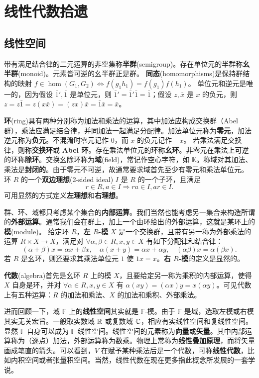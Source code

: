 \chapter{线性代数拾遗}\label{appx:LA}

\section{线性空间}

带有满足结合律的二元运算的非空集称\textbf{半群}(semigroup)。存在单位元的半群称\textbf{幺半群}(monoid)。元素皆可逆的幺半群正是群。
\textbf{同态}(homomorphisms)是保持群结构的映射 $f \in \hom(G_1, G_2 ) \Leftrightarrow f (g_1 h_1 )=f (g_1 ) f (h_1 )$。
单位元和逆元是唯一的，因为假设 $\bar 1',\bar 1$ 是单位元，则 $\bar 1'=\bar 1'\bar 1=\bar 1$；假设 $z,\bar x$ 是 $x$ 的负元，则 $z=z\bar 1=z(x\bar x)=(zx)\bar x=\bar 1\bar x=\bar x$。

\textbf{环}(ring)具有两种分别称为加法和乘法的运算，其中加法应构成交换群（Abel 群），乘法应满足结合律，并同加法一起满足分配律。加法单位元称为\textbf{零元}，加法逆元称为\textbf{负元}。不混淆时零元记作 $0$，而 $x$ 的负元记作 $-x$。
若乘法满足交换律，则称\textbf{交换环}或 \textbf{Abel 环}。存在乘法单位元的环称\textbf{幺环}。非零元在乘法上可逆的环称\textbf{除环}。交换幺除环称为\textbf{域}(field)，常记作空心字符，如 $\mathbb{K}$。称域对其加法、乘法是\textbf{封闭的}。由于零元不可逆，故通常要求域首先至少有零元和乘法单位元。
环 $R$ 的一个\textbf{双边理想}(2-sided ideal) $I$ 是 $R$ 的一个子环，且满足 
\[r \in R, a \in I \Rightarrow r a \in I, a r \in I.\]
可用显然的方式定义\textbf{左理想}和\textbf{右理想}。

群、环、域都只考虑某个集合的\textbf{内部运算}。我们当然也能考虑另一集合来构造所谓的\textbf{外部运算}。通常我们会在群上，加上一个由环给出的外部运算，这就是某环上的\textbf{模}(module)。
给定环 $R$，\textbf{左 $R$-模} $X$ 是一个交换群，且带有另一称为外部乘法的运算 $R \times X \rightarrow X$，满足对 $\forall \alpha,\beta \in R, x,y \in X$ 有如下分配律和结合律：
\[(\alpha+\beta) x=\alpha x+\beta x,\quad \alpha(x+y)=\alpha x+\alpha y,\quad (\alpha\beta)x=\alpha(\beta x).\]
若 $R$ 是幺环，则还要求其乘法单位元 $1$ 使 $1x=x$。\textbf{右 $R$-模}的定义是显然的。

\textbf{代数}(algebra)首先是幺环 $R$ 上的模 $X$，且要给定另一称为乘积的内部运算，使得 $X$ 自身是环，并对 $\forall \alpha \in R, x,y \in X$ 有 $\alpha(xy)=(\alpha x) y=x(\alpha y)$。可见代数上有五种运算：$R$ 的加法和乘法、$X$ 的加法和乘积、外部乘法。

进而回顾一下，域 $\mathbb F$ 上的\textbf{线性空间}其实就是 $\mathbb F$-模。由于 $\mathbb F$ 是域，选取左模或右模其实无关宏旨。一般取实数域 $\mathbb{R}$ 或复数域 $\mathbb{C}$，相应有实线性空间和复线性空间。显然 $\mathbb F$ 自身可以成为 $\mathbb F$-线性空间。线性空间的元素称为\textbf{向量}或\textbf{矢量}。其中内部运算称为（逐点）加法，外部运算称为数乘。物理上常称为\textbf{线性叠加原理}，而将矢量画成笔直的箭头。可以看到，$V$ 在赋予某种乘法后是一个代数，可称\textbf{线性代数}，比如内积空间或者张量积空间。当然，线性代数在现在更多指此概念所发展的一套学说。


